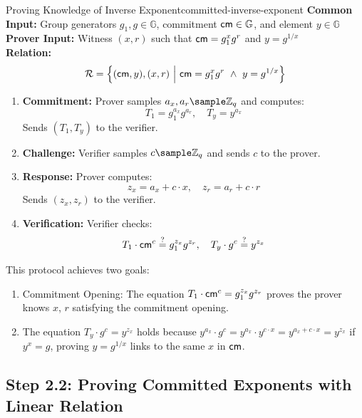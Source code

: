 \begin{protocol}{Proving Knowledge of Inverse Exponent}{committed-inverse-exponent}\label{pok-committed-inverse-exponent}
\textbf{Common Input:} Group generators $g_1, g \in \mathbb{G}$, commitment $\mathsf{cm} \in \mathbb{G}$, and element $y \in \mathbb{G}$ \\
\textbf{Prover Input:} Witness $(x, r)$ such that $\mathsf{cm} = g_1^x g^r$ and $y = g^{1/x}$ \\
\textbf{Relation:} 
\[
\mathcal{R} = \left\{ (\mathsf{cm}, y), (x, r) \ \middle|\ \mathsf{cm} = g_1^x g^r \ \land\ y = g^{1/x} \right\}
\]
\begin{enumerate}
    \item \textbf{Commitment:} Prover samples $a_x, a_r \sample \mathbb{Z}_q$ and computes:
    \[
    T_1 = g_1^{a_x} g^{a_r}, \quad T_y = y^{a_x}
    \]
    Sends $(T_1, T_y)$ to the verifier.

    \item \textbf{Challenge:} Verifier samples $c  \sample  \mathbb{Z}_q$ and sends $c$ to the prover.

    \item \textbf{Response:} Prover computes:
    \[
    z_x = a_x + c \cdot x, \quad z_r = a_r + c \cdot r
    \]
    Sends $(z_x, z_r)$ to the verifier.

    \item \textbf{Verification:} Verifier checks:
    \[
    T_1 \cdot \mathsf{cm}^c \stackrel{?}{=} g_1^{z_x} g^{z_r}, \quad T_y \cdot g^c \stackrel{?}{=} y^{z_x}
    \]
\end{enumerate}
\end{protocol}

This protocol achieves two goals:
\begin{enumerate}
    \item Commitment Opening: The equation $T_1 \cdot \mathsf{cm}^c = g_1^{z_x} g^{z_r}$ proves the prover knows $x$, $r$ satisfying the commitment opening.
    \item The equation $T_y \cdot g^c = y^{z_x}$ holds because $y^{a_x} \cdot g^c = y^{a_x} \cdot y^{c \cdot x} = y^{a_x + c \cdot x} = y^{z_x}$ if $y^x = g$, proving $y = g^{1/x}$ links to the same $x$ in $\mathsf{cm}$.
\end{enumerate}






\newpage
\subsection{Step 2.2: Proving Committed Exponents with Linear Relation}

